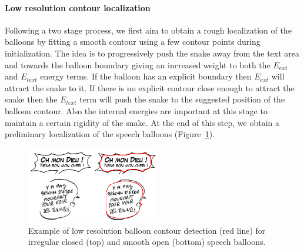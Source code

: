 \paragraph{Low resolution contour localization}
Following a two stage process, we first aim to obtain a rough localization of the balloons by fitting a smooth contour using a few contour points during initialization.
The idea is to progressively push the snake away from the text area and towards the balloon boundary giving an increased weight to both the $E_{ext}$ and $E_{text}$ energy terms.
If the balloon has an explicit boundary then $E_{ext}$ will attract the snake to it.
If there is no explicit contour close enough to attract the snake then the $E_{text}$ term will push the snake to the suggested position of the balloon contour.
Also the internal energies are important at this stage to maintain a certain rigidity of the snake.
At the end of this step, we obtain a preliminary localization of the speech balloons (Figure~\ref{fig:se:mono_res_det}). 

	\begin{figure}[!ht]	%
	  \centering
		\includegraphics[trim = 0mm 3mm 0mm 1mm, clip, width=220px]{mono_res_det.png}
		\caption[Examples of low resolution contour detection for balloon extraction]{Example of low resolution balloon contour detection (red line) for irregular closed (top) and smooth open (bottom) speech balloons.}
		\label{fig:se:mono_res_det}
	\end{figure}


